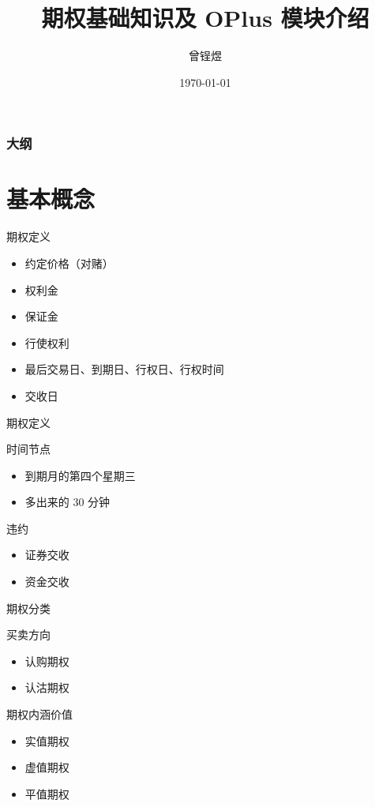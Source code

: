 \documentclass[12pt]{ctexbeamer}	%
\title[期权知识分享]{期权基础知识及 OPlus 模块介绍}	%
\author[Zengyu Zeng]{曾锃煜}
\institute[Hundsun]{资管，研发四部}	%
\date{\today}
\begin{document}
\begin{frame}
\titlepage
\end{frame}


\begin{frame}
\frametitle{大纲}
\tableofcontents
\end{frame}


\section{基本概念}

\begin{frame}{期权定义}
  \begin{itemize} %
    \item 约定价格（对赌）
    \item 权利金
    \item 保证金
    \item 行使权利
    \item 最后交易日、到期日、行权日、行权时间
    \item 交收日
  \end{itemize}
\end{frame}

\begin{frame}{期权定义}
  \begin{block}{时间节点}
    \begin{itemize}
      \item 到期月的第四个星期三
      \item 多出来的 30 分钟
    \end{itemize}
  \end{block}
  \begin{block}{违约}
    \begin{itemize}
      \item 证券交收
      \item 资金交收
    \end{itemize}
  \end{block}
\end{frame}

\begin{frame}{期权分类}
  \begin{block}{买卖方向}
    \begin{itemize}
      \item 认购期权
      \item 认沽期权
    \end{itemize}
  \end{block}
  \begin{block}{期权内涵价值}
    \begin{itemize}
      \item 实值期权
      \item 虚值期权
      \item 平值期权
    \end{itemize}
  \end{block}
\end{frame}
\end{document}
